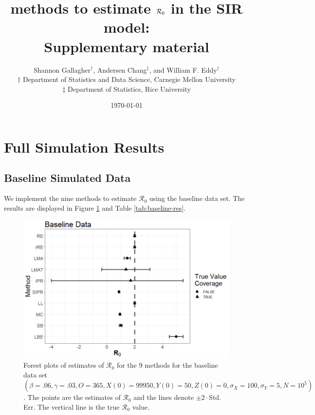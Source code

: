 \documentclass[12pt]{article}
\title{\Wxxsir methods to estimate $\rr$ in the SIR model: \\ Supplementary material}
\author{ Shannon Gallagher$^{\dag}$, Andersen Chang$^{\ddag}$, and William F. Eddy$^{\dag}$ \\$\dag$ Department of Statistics and Data Science, Carnegie Mellon University\\ $\ddag$ Department of Statistics, Rice University}
\date{\today}
\newcommand{\xxsir}{\ensuremath{9} } %
\newcommand{\wxxsir}{nine } %
\newcommand{\rr}{\ensuremath{\mathcal{R}_0}}
\begin{document}
\maketitle

\section{Full Simulation Results}

\subsection{Baseline Simulated Data}\label{sec:res-base}
We implement the \wxxsir methods to estimate $\rr$ using the baseline data set.  The results are displayed in Figure \ref{fig:baseline-res} and Table \ref{tab:baseline-res}.
\begin{figure}[H]
  \centering
  \includegraphics[scale=0.5]{images/BaseBase.jpg}
  \caption{Forest plots of estimates of $\rr$ for the \xxsir methods for the baseline data set $(\beta=.06, \gamma=.03, O=365, X(0)=99950, Y(0)=50, Z(0)=0, \sigma_X=100, \sigma_Y=5, N=10^5)$.  The points are the estimates of $\rr$ and the lines denote $\pm 2\cdot $Std. Err.  The vertical line is the true $\rr$ value.}\label{fig:baseline-res}
  \end{figure}
\end{document}
